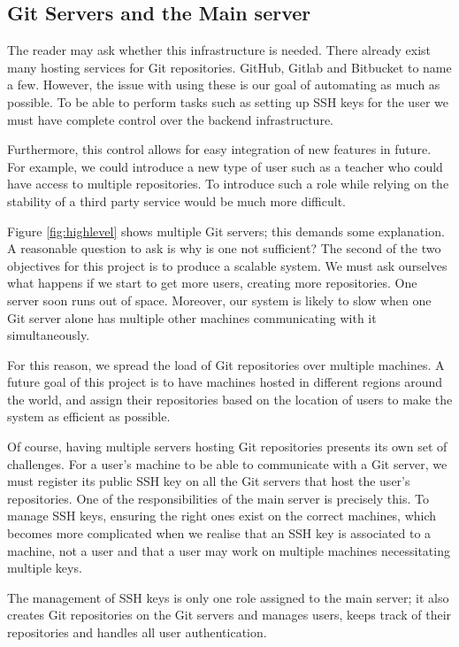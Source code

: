 \subsection{Git Servers and the Main server}

The reader may ask whether this infrastructure is needed. There already exist many hosting services for Git repositories. GitHub, Gitlab and Bitbucket to name a few. However, the issue with using these is our goal of automating as much as possible. To be able to perform tasks such as setting up SSH keys for the user we must have complete control over the backend infrastructure. 

Furthermore, this control allows for easy integration of new features in future. For example, we could introduce a new type of user such as a teacher who could have access to multiple repositories. To introduce such a role while relying on the stability of a third party service would be much more difficult.

Figure \ref{fig:highlevel} shows multiple Git servers; this demands some explanation. A reasonable question to ask is why is one not sufficient? The second of the two objectives for this project is to produce a scalable system. We must ask ourselves what happens if we start to get more users, creating more repositories. One server soon runs out of space. Moreover, our system is likely to slow when one Git server alone has multiple other machines communicating with it simultaneously.

For this reason, we spread the load of Git repositories over multiple machines. A future goal of this project is to have machines hosted in different regions around the world, and assign their repositories based on the location of users to make the system as efficient as possible.

Of course, having multiple servers hosting Git repositories presents its own set of challenges. For a user's machine to be able to communicate with a Git server, we must register its public SSH key on all the Git servers that host the user's repositories. One of the responsibilities of the main server is precisely this. To manage SSH keys, ensuring the right ones exist on the correct machines, which becomes more complicated when we realise that an SSH key is associated to a machine, not a user and that a user may work on multiple machines necessitating multiple keys.

The management of SSH keys is only one role assigned to the main server; it also creates Git repositories on the Git servers and manages users, keeps track of their repositories and handles all user authentication.

